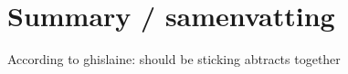 \documentclass[
  letterpaper,
  DIV=11,
  numbers=noendperiod]{scrreprt}
\begin{document}

\hypertarget{summary-samenvatting}{%
\chapter*{Summary / samenvatting}\label{summary-samenvatting}}


According to ghislaine: should be sticking abtracts together
\end{document}
